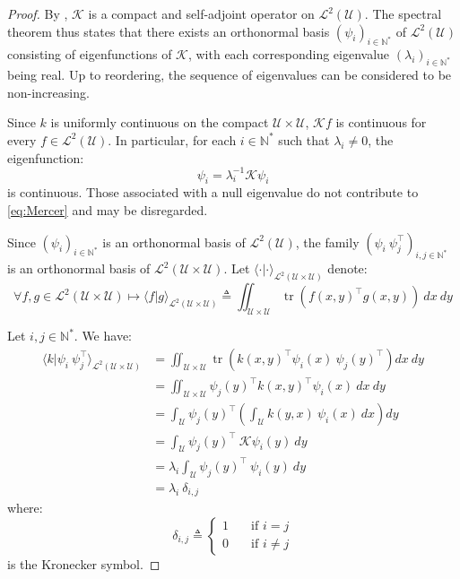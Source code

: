 \begin{proof}
	By , $\mathcal{K}$ is a compact and self-adjoint operator on $\mathcal{L}^2(\mathcal{U})$. The spectral theorem thus states that there exists an orthonormal basis $(\psi_i)_{i\in\mathbb{N}^*}$ of $\mathcal{L}^2(\mathcal{U})$ consisting of eigenfunctions of $\mathcal{K}$, with each corresponding eigenvalue $(\lambda_i)_{i\in\mathbb{N}^*}$ being real. Up to reordering, the sequence of eigenvalues can be considered to be non-increasing.

	Since $k$ is uniformly continuous on the compact $\mathcal{U}\times\mathcal{U}$, $\mathcal{K}f$ is continuous for every $f\in\mathcal{L}^2(\mathcal{U})$. In particular, for each $i\in\mathbb{N}^*$ such that $\lambda_i\neq0$, the eigenfunction:
	\begin{equation}
		\psi_i=\lambda_i^{-1}\mathcal{K}\psi_i
	\end{equation}
	is continuous. Those associated with a null eigenvalue do not contribute to \eqref{eq:Mercer} and may be disregarded.

	Since $(\psi_i)_{i\in\mathbb{N}^*}$ is an orthonormal basis of $\mathcal{L}^2(\mathcal{U})$, the family $(\psi_i\:\psi_j^\top)_{i,j\in\mathbb{N}^*}$ is an orthonormal basis of $\mathcal{L}^2(\mathcal{U}\times\mathcal{U})$. Let $\langle\cdot|\cdot\rangle_{\mathcal{L}^2(\mathcal{U}\times\mathcal{U})}$ denote:
	\begin{equation}
		\forall f,g\in\mathcal{L}^2(\mathcal{U}\times\mathcal{U})\mapsto\langle f|g\rangle_{\mathcal{L}^2(\mathcal{U}\times\mathcal{U})}\triangleq\iint_{\mathcal{U}\times\mathcal{U}}{\operatorname{tr}\left(f(x,y)^\top g(x,y)\right)\:dx\:dy}
	\end{equation}

	Let $i,j\in\mathbb{N}^*$. We have:
	\begin{equation}
		\begin{aligned}
			\langle k|\psi_i\:\psi_j^\top\rangle_{\mathcal{L}^2(\mathcal{U}\times\mathcal{U})}&=\iint_{\mathcal{U}\times\mathcal{U}}{\operatorname{tr}\left(k(x,y)^\top\psi_i(x)\:\psi_j(y)^\top\right)dx\:dy}\\
			&=\iint_{\mathcal{U}\times\mathcal{U}}{\psi_j(y)^\top k(x,y)^\top\psi_i(x)\:dx\:dy}\\
			&=\int_{\mathcal{U}}{\psi_j(y)^\top\left(\int_{\mathcal{U}}{k(y,x)\:\psi_i(x)\:dx}\right)dy}\\
			&=\int_{\mathcal{U}}{\psi_j(y)^\top\:\mathcal{K}\psi_i(y)\:dy}\\
			&=\lambda_i\int_{\mathcal{U}}{\psi_j(y)^\top\:\psi_i(y)\:dy}\\
			&=\lambda_i\:\delta_{i,j}
		\end{aligned}
	\end{equation}
	where:
	\begin{equation}
		\delta_{i,j}\triangleq\left\{\begin{aligned}
		1&\quad\text{if }i=j\\0&\quad\text{if }i\neq j
		\end{aligned}\right.
	\end{equation}
	is the Kronecker symbol.


\end{proof}
